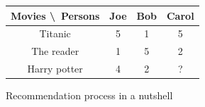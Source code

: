 \begin{figure}
\centering
\begin{tabular}{|c|c|c|c|}
\hline
Movies \textbackslash\ Persons & Joe & Bob & Carol \\
\hline
Titanic & 5 & 1 & 5 \\
\hline
The reader & 1 & 5 & 2 \\
\hline
Harry potter & 4 & 2 & ? \\
\hline
\end{tabular}
\caption{Recommendation process in a nutshell}
\label{tab:recommendation_process_alt}
\end{figure}